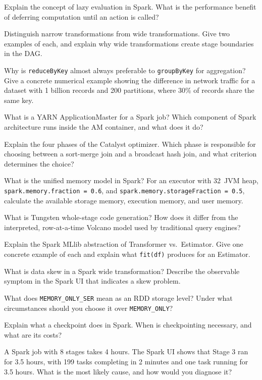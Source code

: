 \sq Explain the concept of lazy evaluation in Spark. What is the
performance benefit of deferring computation until an action is called?

\sq Distinguish narrow transformations from wide transformations.
Give two examples of each, and explain why wide transformations create
stage boundaries in the DAG.

\sq Why is \texttt{reduceByKey} almost always preferable to
\texttt{groupByKey} for aggregation? Give a concrete numerical example
showing the difference in network traffic for a dataset with 1 billion
records and 200 partitions, where 30\% of records share the same key.

\sq What is a YARN ApplicationMaster for a Spark job? Which component
of Spark architecture runs inside the AM container, and what does it do?

\sq Explain the four phases of the Catalyst optimizer. Which phase is
responsible for choosing between a sort-merge join and a broadcast hash
join, and what criterion determines the choice?

\sq What is the unified memory model in Spark? For an executor with
32\GB\ JVM heap, \texttt{spark.memory.fraction = 0.6}, and
\texttt{spark.memory.storageFraction = 0.5}, calculate the available
storage memory, execution memory, and user memory.

\sq What is Tungsten whole-stage code generation? How does it differ
from the interpreted, row-at-a-time Volcano model used by traditional
query engines?

\sq Explain the Spark MLlib abstraction of Transformer vs.\ Estimator.
Give one concrete example of each and explain what \texttt{fit(df)}
produces for an Estimator.

\sq What is data skew in a Spark wide transformation? Describe the
observable symptom in the Spark UI that indicates a skew problem.

\sq What does \texttt{MEMORY\_ONLY\_SER} mean as an RDD storage level?
Under what circumstances should you choose it over \texttt{MEMORY\_ONLY}?

\sq Explain what a checkpoint does in Spark. When is checkpointing
necessary, and what are its costs?

\sq A Spark job with 8 stages takes 4 hours. The Spark UI shows that
Stage 3 ran for 3.5 hours, with 199 tasks completing in 2 minutes and
one task running for 3.5 hours. What is the most likely cause, and
how would you diagnose it?

\bigskip
{}

